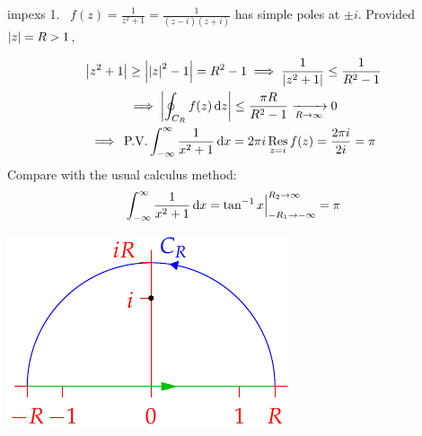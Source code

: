 \begin{examples}{}{impexs}
\hangindent\leftmargini
\textup{1.} \ $f(z)=\frac 1{z^2+1}=\frac 1{(z-i)(z+i)}$ has simple poles at $\pm i$. Provided $\left| z\right|=R>1$,
\begin{enumerate}\setcounter{enumi}{1}
  \begin{minipage}[t]{0.65\linewidth}\vspace{-10pt}
  \item[]\begin{gather*}
  \left| z^2+1\right|\ge \left| \left| z\right|^2-1\right|=R^2-1\implies \frac 1{\left| z^2+1\right|}\le\frac 1{R^2-1}\\
  \implies\left| \oint_{C_R}f(z)\,{\mathrm{d} z}\right|\le \frac{\pi R}{R^2-1}\xrightarrow[R\to\infty]{}0\\
  \implies \,\text{P.V.}\int_{-\infty}^\infty\frac 1{x^2+1}\,{\mathrm{d} x}=2\pi i\operatorname*{Res}_{z=i}f(z)=\frac{2\pi i}{2i}=\pi
  \end{gather*}
  Compare with the usual calculus method:
  \[\int_{-\infty}^\infty \frac 1{x^2+1}\,{\mathrm{d} x}=\tan^{-1}x\Big|_{-R_1\to-\infty}^{R_2\to\infty}=\pi\]
	\end{minipage}\begin{minipage}[t]{0.35\linewidth}\vspace{0pt}
	\flushright\includegraphics{integral2}
	\end{minipage}\par
  

\end{enumerate}
\end{examples}
